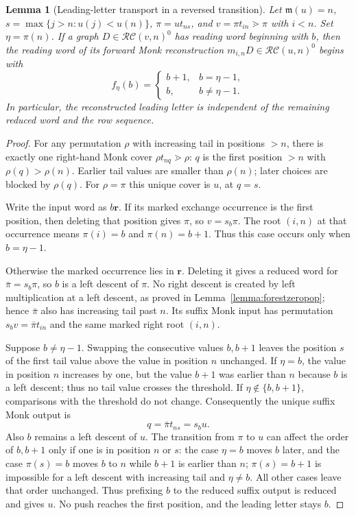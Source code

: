 \documentclass{amsart}
\newtheorem{lemma}{Lemma}[subsection]
\theoremstyle{definition}
\theoremstyle{remark}
\numberwithin{equation}{subsection}
\newcommand{\RC}{\mathcal{RC}}
\newcommand{\maxd}{\mathfrak{m}}
\begin{document}
\begin{lemma}[Leading-letter transport in a reversed transition]\label{lemma:forestzeroleadingstep}
Let $\maxd(u)=n$, $s=\max\{j>n:u(j)<u(n)\}$, $\pi=ut_{ns}$, and $v=\pi t_{in}\gtrdot\pi$ with $i<n$. Set $\eta=\pi(n)$. If a graph $D\in\RC(v,n)^0$ has reading word beginning with $b$, then the reading word of its forward Monk reconstruction $m_{i,n}D\in\RC(u,n)^0$ begins with
$$f_\eta(b)=
\begin{cases}
b+1,&b=\eta-1,\\
b,&b\neq\eta-1.
\end{cases}$$
In particular, the reconstructed leading letter is independent of the remaining reduced word and the row sequence.
\end{lemma}
\begin{proof}
For any permutation $\rho$ with increasing tail in positions $>n$, there is exactly one right-hand Monk cover $\rho t_{nq}\gtrdot\rho$: $q$ is the first position $>n$ with $\rho(q)>\rho(n)$. Earlier tail values are smaller than $\rho(n)$; later choices are blocked by $\rho(q)$. For $\rho=\pi$ this unique cover is $u$, at $q=s$.

Write the input word as $b\mathbf r$. If its marked exchange occurrence is the first position, then deleting that position gives $\pi$, so $v=s_b\pi$. The root $(i,n)$ at that occurrence means $\pi(i)=b$ and $\pi(n)=b+1$. Thus this case occurs only when $b=\eta-1$.

Otherwise the marked occurrence lies in $\mathbf r$. Deleting it gives a reduced word for $\bar\pi=s_b\pi$, so $b$ is a left descent of $\pi$. No right descent is created by left multiplication at a left descent, as proved in Lemma~\ref{lemma:forestzeropop}; hence $\bar\pi$ also has increasing tail past $n$. Its suffix Monk input has permutation $s_bv=\bar\pi t_{in}$ and the same marked right root $(i,n)$.

Suppose $b\neq\eta-1$. Swapping the consecutive values $b,b+1$ leaves the position $s$ of the first tail value above the value in position $n$ unchanged. If $\eta=b$, the value in position $n$ increases by one, but the value $b+1$ was earlier than $n$ because $b$ is a left descent; thus no tail value crosses the threshold. If $\eta\notin\{b,b+1\}$, comparisons with the threshold do not change. Consequently the unique suffix Monk output is
$$q=\bar\pi t_{ns}=s_bu.$$
Also $b$ remains a left descent of $u$. The transition from $\pi$ to $u$ can affect the order of $b,b+1$ only if one is in position $n$ or $s$: the case $\eta=b$ moves $b$ later, and the case $\pi(s)=b$ moves $b$ to $n$ while $b+1$ is earlier than $n$; $\pi(s)=b+1$ is impossible for a left descent with increasing tail and $\eta\neq b$. All other cases leave that order unchanged. Thus prefixing $b$ to the reduced suffix output is reduced and gives $u$. No push reaches the first position, and the leading letter stays $b$.


\end{proof}
\end{document}
